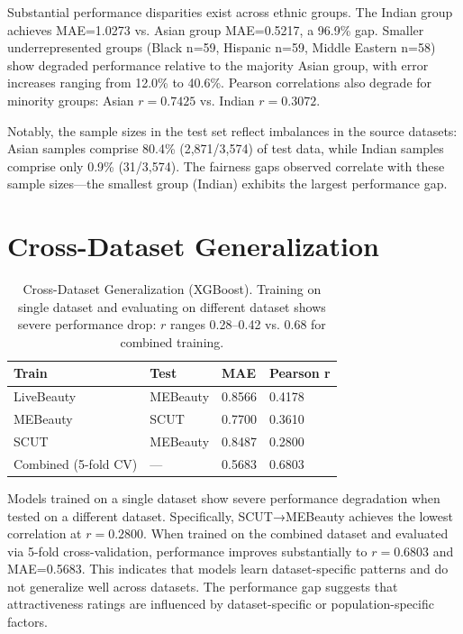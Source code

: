 \documentclass[a4paper,oneside,bibliography=totoc]{scrbook}
\begin{document}
Substantial performance disparities exist across ethnic groups. The Indian group achieves MAE=1.0273 vs. Asian group MAE=0.5217, a 96.9\% gap. Smaller underrepresented groups (Black n=59, Hispanic n=59, Middle Eastern n=58) show degraded performance relative to the majority Asian group, with error increases ranging from 12.0\% to 40.6\%. Pearson correlations also degrade for minority groups: Asian $r=0.7425$ vs. Indian $r=0.3072$.

Notably, the sample sizes in the test set reflect imbalances in the source datasets: Asian samples comprise 80.4\% (2,871/3,574) of test data, while Indian samples comprise only 0.9\% (31/3,574). The fairness gaps observed correlate with these sample sizes---the smallest group (Indian) exhibits the largest performance gap.

\section{Cross-Dataset Generalization}

\begin{table}[tb]
  \centering
  \small
  \begin{tabularx}{\textwidth}{lXXX}
    \toprule
    \textbf{Train} & \textbf{Test} & \textbf{MAE} & \textbf{Pearson r} \\
    \midrule
    LiveBeauty & MEBeauty & 0.8566 & 0.4178 \\
    MEBeauty & SCUT & 0.7700 & 0.3610 \\
    SCUT & MEBeauty & 0.8487 & 0.2800 \\
    \midrule
    Combined (5-fold CV) & --- & 0.5683 & 0.6803 \\
    \bottomrule
  \end{tabularx}
  \caption{Cross-Dataset Generalization (XGBoost). Training on single dataset and evaluating on different dataset shows severe performance drop: $r$ ranges 0.28--0.42 vs. 0.68 for combined training.}
  \label{tab:cross_dataset}
\end{table}

Models trained on a single dataset show severe performance degradation when tested on a different dataset. Specifically, SCUT→MEBeauty achieves the lowest correlation at $r=0.2800$. When trained on the combined dataset and evaluated via 5-fold cross-validation, performance improves substantially to $r=0.6803$ and MAE=0.5683. This indicates that models learn dataset-specific patterns and do not generalize well across datasets. The performance gap suggests that attractiveness ratings are influenced by dataset-specific or population-specific factors.
\end{document}
